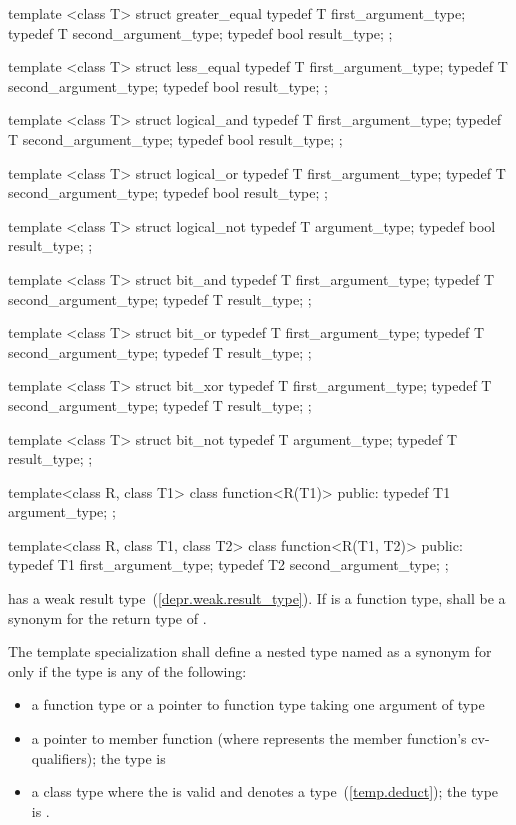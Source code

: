 \begin{codeblock}
{  template <class T> struct greater_equal {
    typedef T first_argument_type;
    typedef T second_argument_type;
    typedef bool result_type;
  };

  template <class T> struct less_equal {
    typedef T first_argument_type;
    typedef T second_argument_type;
    typedef bool result_type;
  };

  template <class T> struct logical_and {
    typedef T first_argument_type;
    typedef T second_argument_type;
    typedef bool result_type;
  };

  template <class T> struct logical_or {
    typedef T first_argument_type;
    typedef T second_argument_type;
    typedef bool result_type;
  };

  template <class T> struct logical_not {
    typedef T argument_type;
    typedef bool result_type;
  };

  template <class T> struct bit_and {
    typedef T first_argument_type;
    typedef T second_argument_type;
    typedef T result_type;
  };

  template <class T> struct bit_or {
    typedef T first_argument_type;
    typedef T second_argument_type;
    typedef T result_type;
  };

  template <class T> struct bit_xor {
    typedef T first_argument_type;
    typedef T second_argument_type;
    typedef T result_type;
  };

  template <class T> struct bit_not {
    typedef T argument_type;
    typedef T result_type;
  };

  template<class R, class T1>
  class function<R(T1)> {
  public:
    typedef T1 argument_type;
  };

  template<class R, class T1, class T2>
  class function<R(T1, T2)> {
  public:
    typedef T1 first_argument_type;
    typedef T2 second_argument_type;
  };
}
\end{codeblock}

\pnum
{} has a weak result type~(\ref{depr.weak.result_type}).
If  is a function type,
 shall be a synonym for the return type of .

\pnum
The template specialization 
shall define a nested type named 
as a synonym for 
only if the type  is any of the following:
\begin{itemize}
\item a function type or a pointer to function type taking one argument of type 
\item a pointer to member function  \cv{} (where \cv{} represents the member function's cv-qualifiers); the type  is \cv{} 
\item a class type where the  
is valid and denotes a type~(\ref{temp.deduct});
the type  is .
\end{itemize}

